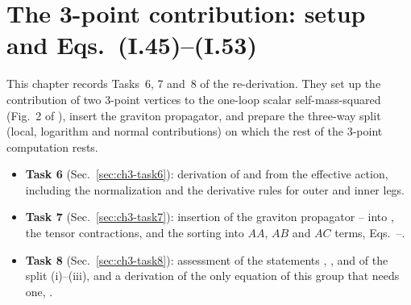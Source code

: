 \providecommand{\chIIIbr}[3]{\left[\!\left[\,#1\,\middle|\,#2\,\right]\!\right]_{#3}}
\providecommand{\chIIIok}{\textcolor{tagD}{\ensuremath{\checkmark}}}
\providecommand{\chIIIno}{\textcolor{tagC}{\ensuremath{\times}}}
\providecommand{\chIIIcode}[1]{\texttt{code/03\_three\_point\_setup/#1}}
\providecommand{\chIIIhtag}[1]{\renewcommand{\theHequation}{ch3tag.#1}}

\chapter{The 3-point contribution: setup and Eqs.~(I.45)--(I.53)}
\label{ch:three-point-setup}

This chapter records Tasks~6, 7 and~8 of the re-derivation. They set up the contribution of two 3-point vertices
to the one-loop scalar self-mass-squared (Fig.~2 of \PI), insert the graviton propagator, and prepare the
three-way split (local, logarithm and normal contributions) on which the rest of the 3-point computation rests.
\begin{itemize}[leftmargin=14pt]
\item \textbf{Task 6} (Sec.~\ref{sec:ch3-task6}): derivation of  and  from the effective action, including the
normalization and the derivative rules for outer and inner legs.
\item \textbf{Task 7} (Sec.~\ref{sec:ch3-task7}): insertion of the graviton propagator -- into , the tensor
contractions, and the sorting into $AA$, $AB$ and $AC$ terms, Eqs.~--.
\item \textbf{Task 8} (Sec.~\ref{sec:ch3-task8}): assessment of the statements , ,  and of the split (i)--(iii),
and a derivation of the only equation of this group that needs one, .
\end{itemize}

